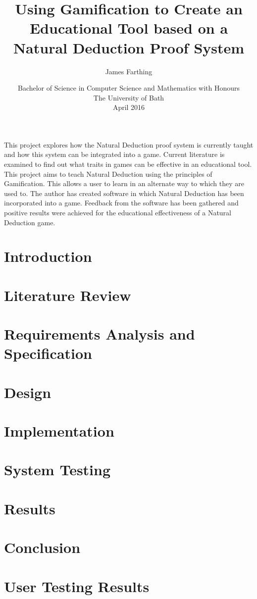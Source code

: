 \documentclass[11pt,openright,a4paper]{report}
\title{Using Gamification to Create an Educational Tool based on a Natural Deduction Proof System}
\author{James Farthing}
\date{Bachelor of Science in Computer Science and Mathematics with Honours\\The University of Bath\\April 2016}
\begin{document}
 
\newpage

\abstract

This project explores how the Natural Deduction proof system is currently taught and how this system can be integrated into a game. Current literature is examined to find out what traits in games can be effective in an educational tool. This project aims to teach Natural Deduction using the principles of Gamification. This allows a user to learn in an alternate way to which they are used to. The author has created software in which Natural Deduction has been incorporated into a game. Feedback from the software has been gathered and positive results were achieved for the educational effectiveness of a Natural Deduction game.
 
\newpage

\maketitle
\newpage
\tableofcontents
\newpage
 
\chapter{Introduction}
	
\chapter{Literature Review} \label{lit}
	
\chapter{Requirements Analysis and Specification}
	
\chapter{Design}
	
\chapter{Implementation} \label{imp}
	
\chapter{System Testing}
	
\chapter{Results} \label{results}
	
\chapter{Conclusion}
	
 
\newpage


\appendix
\chapter{User Testing Results} \label{appA}
	
\end{document}
